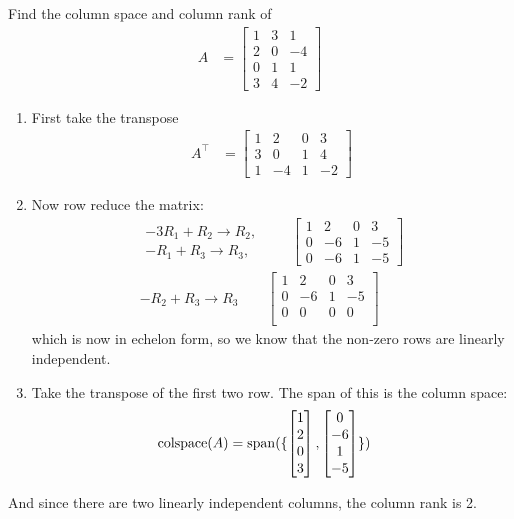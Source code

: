 \begin{example}
Find the column space and column rank of 
\begin{align*} A & =
\begin{bmatrix} %
1 & 3 & 1\\
2 & 0 &  -4\\
0 & 1 & 1 \\
3 & 4 & -2
\end{bmatrix}
\end{align*}

\begin{enumerate}
\item First take the transpose 
%
\begin{align*}
A^{\intercal} & = \begin{bmatrix}
1 & 2 & 0 & 3 \\
3 & 0 & 1 & 4 \\
1 & -4 & 1 & -2 
\end{bmatrix}
\end{align*}
\item Now row reduce the matrix:
%
\begin{align*}
\begin{array}{r}	
-3R_1 + R_2 \rightarrow R_2, \\
-R_1 + R_3 \rightarrow R_3, 
\end{array} \qquad
\begin{bmatrix}
1& 2 & 0 & 3 \\
0 & -6 &1 & -5 \\
0 & -6 & 1 & -5 
\end{bmatrix} \\
-R_2 + R_3 \rightarrow R_3 \qquad
\begin{bmatrix}
1& 2 & 0 & 3 \\
0 & -6 &1 & -5 \\
0 & 0 & 0 & 0 \\
\end{bmatrix} 
\end{align*}
which is now in echelon form, so we know that the non-zero rows are linearly independent.  

\item Take the transpose of the first two row.  The span of this is the column space:
%
\begin{align*}
\text{colspace}(A) & = \operatorname{span}(\{ \begin{bmatrix}
1 \\ 2 \\ 0 \\ 3
\end{bmatrix}, \begin{bmatrix}
0 \\ -6 \\ 1 \\ -5 
\end{bmatrix} \} ) 
\end{align*}
\end{enumerate}
And since there are two linearly independent columns, the column rank is 2. 
\end{example}

